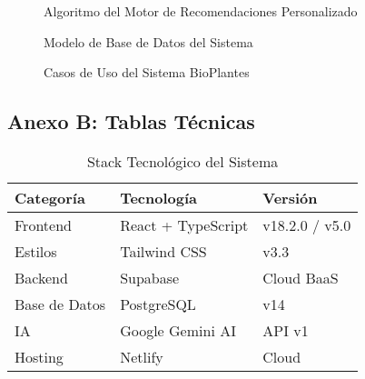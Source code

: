 \documentclass[12pt,a4paper]{article}
\begin{document}
\begin{figure}[H]
    \centering
    \caption{Algoritmo del Motor de Recomendaciones Personalizado}
    \label{fig:motor_recomendaciones}
\end{figure}

\begin{figure}[H]
    \centering
    \caption{Modelo de Base de Datos del Sistema}
    \label{fig:modelo_er}
\end{figure}

\begin{figure}[H]
    \centering
    \caption{Casos de Uso del Sistema BioPlantes}
    \label{fig:casos_uso}
\end{figure}

\newpage

\subsection{Anexo B: Tablas Técnicas}

\begin{table}[H]
\centering
\caption{Stack Tecnológico del Sistema}
\label{tab:tecnologias}
\begin{tabular}{|p{3.5cm}|p{4cm}|p{5cm}|}
\hline
\textbf{Categoría} & \textbf{Tecnología} & \textbf{Versión} \\ \hline
Frontend & React + TypeScript & v18.2.0 / v5.0 \\ \hline
Estilos & Tailwind CSS & v3.3 \\ \hline
Backend & Supabase & Cloud BaaS \\ \hline
Base de Datos & PostgreSQL & v14 \\ \hline
IA & Google Gemini AI & API v1 \\ \hline
Hosting & Netlify & Cloud \\ \hline
\end{tabular}
\end{table}
\end{document}
